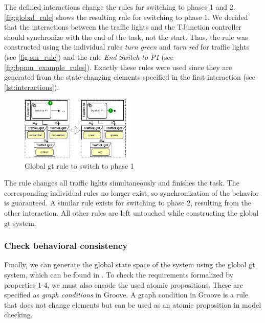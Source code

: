 \documentclass{jot}
\begin{document}
The defined interactions change the rules for switching to phases 1 and 2.
\autoref{fig:global_rule} shows the resulting rule for switching to phase 1.
We decided that the interactions between the traffic lights and the TJunction controller should synchronize with the end of the task, not the start.
Thus, the rule was constructed using the individual rules \textit{turn green} and \textit{turn red} for traffic lights (see \cref{fig:sm_rule}) and the rule \textit{End Switch to P1} (see \cref{fig:bpmn_example_rules}).
Exactly these rules were used since they are generated from the state-changing elements specified in the first interaction (see \cref{lst:interactions}).

\begin{figure}[h]
    \centering
    \includegraphics[width=0.475\textwidth]{figures/global_rule.pdf}
    \caption{Global \gls*{gt} rule to switch to phase 1}
    \label{fig:global_rule}
\end{figure}

The rule changes all traffic lights simultaneously and finishes the task.
The corresponding individual rules no longer exist, so synchronization of the behavior is guaranteed.
A similar rule exists for switching to phase 2, resulting from the other interaction.
All other rules are left untouched while constructing the global \gls*{gt} system.

\subsubsection{Check behavioral consistency}
Finally, we can generate the global state space of the system using the global \gls*{gt} system, which can be found in \cite{krauterArtifactsBehavioralConsistency2023}.
To check the requirements formalized by properties 1-4, we must also encode the used atomic propositions.
These are specified as \textit{graph conditions} in Groove.
A graph condition in Groove is a rule that does not change elements but can be used as an atomic proposition in model checking.
\end{document}
